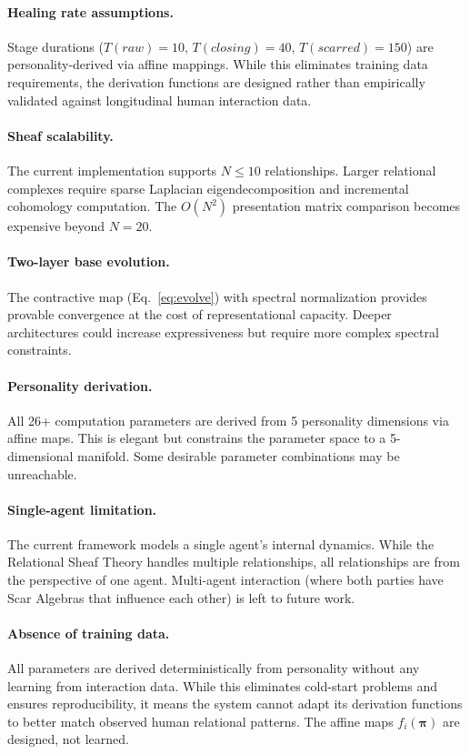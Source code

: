 \documentclass[11pt]{article}
\begin{document}
\paragraph{Healing rate assumptions.} Stage durations ($T(raw)=10$, $T(closing)=40$, $T(scarred)=150$) are personality-derived via affine mappings. While this eliminates training data requirements, the derivation functions are designed rather than empirically validated against longitudinal human interaction data.

\paragraph{Sheaf scalability.} The current implementation supports $N \leq 10$ relationships. Larger relational complexes require sparse Laplacian eigendecomposition and incremental cohomology computation. The $O(N^2)$ presentation matrix comparison becomes expensive beyond $N = 20$.

\paragraph{Two-layer base evolution.} The contractive map (Eq.~\ref{eq:evolve}) with spectral normalization provides provable convergence at the cost of representational capacity. Deeper architectures could increase expressiveness but require more complex spectral constraints.

\paragraph{Personality derivation.} All 26+ computation parameters are derived from 5 personality dimensions via affine maps. This is elegant but constrains the parameter space to a 5-dimensional manifold. Some desirable parameter combinations may be unreachable.

\paragraph{Single-agent limitation.} The current framework models a single agent's internal dynamics. While the Relational Sheaf Theory handles multiple relationships, all relationships are from the perspective of one agent. Multi-agent interaction (where both parties have Scar Algebras that influence each other) is left to future work.

\paragraph{Absence of training data.} All parameters are derived deterministically from personality without any learning from interaction data. While this eliminates cold-start problems and ensures reproducibility, it means the system cannot adapt its derivation functions to better match observed human relational patterns. The affine maps $f_i(\boldsymbol{\pi})$ are designed, not learned.
\end{document}
